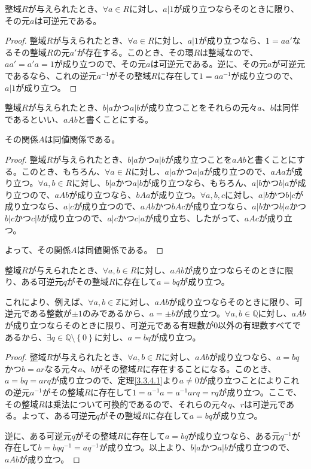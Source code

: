\documentclass[dvipdfmx]{jsarticle}
\begin{document}
\begin{thm}\label{3.3.4.2}
整域$R$が与えられたとき、$\forall a \in R$に対し、$a|1$が成り立つならそのときに限り、その元$a$は可逆元である。
\end{thm}
\begin{proof}
整域$R$が与えられたとき、$\forall a \in R$に対し、$a|1$が成り立つなら、$1 = aa'$なるその整域$R$の元$a'$が存在する。このとき、その環$R$は整域なので、$aa' = a'a = 1$が成り立つので、その元$a$は可逆元である。逆に、その元$a$が可逆元であるなら、これの逆元$a^{-1}$がその整域$R$に存在して$1 = aa^{-1}$が成り立つので、$a|1$が成り立つ。
\end{proof}
\begin{dfn}
整域$R$が与えられたとき、$b|a$かつ$a|b$が成り立つことをそれらの元々$a$、$b$は同伴であるといい、$aAb$と書くことにする。
\end{dfn}
\begin{thm}\label{3.3.4.3} その関係$A$は同値関係である。
\end{thm}
\begin{proof}
整域$R$が与えられたとき、$b|a$かつ$a|b$が成り立つことを$aAb$と書くことにする。このとき、もちろん、$\forall a \in R$に対し、$a|a$かつ$a|a$が成り立つので、$aAa$が成り立つ。$\forall a,b \in R$に対し、$b|a$かつ$a|b$が成り立つなら、もちろん、$a|b$かつ$b|a$が成り立つので、$aAb$が成り立つなら、$bAa$が成り立つ。$\forall a,b,c$に対し、$a|b$かつ$b|c$が成り立つなら、$a|c$が成り立つので、$aAb$かつ$bAc$が成り立つなら、$a|b$かつ$b|a$かつ$b|c$かつ$c|b$が成り立つので、$a|c$かつ$c|a$が成り立ち、したがって、$aAc$が成り立つ。\par
よって、その関係$A$は同値関係である。
\end{proof}
\begin{thm}\label{3.3.4.4}
整域$R$が与えられたとき、$\forall a,b \in R$に対し、$aAb$が成り立つならそのときに限り、ある可逆元$q$がその整域$R$に存在して$a = bq$が成り立つ。
\end{thm}\par
これにより、例えば、$\forall a,b \in \mathbb{Z}$に対し、$aAb$が成り立つならそのときに限り、可逆元である整数が$\pm 1$のみであるから、$a = \pm b$が成り立つ。$\forall a,b \in \mathbb{Q}$に対し、$aAb$が成り立つならそのときに限り、可逆元である有理数が$0$以外の有理数すべてであるから、$\exists q \in \mathbb{Q} \setminus \left\{ 0 \right\}$に対し、$a = bq$が成り立つ。
\begin{proof}
整域$R$が与えられたとき、$\forall a,b \in R$に対し、$aAb$が成り立つなら、$a = bq$かつ$b = ar$なる元々$a$、$b$がその整域$R$に存在することになる。このとき、$a = bq = arq$が成り立つので、定理\ref{3.3.4.1}より$a \neq 0$が成り立つことによりこれの逆元$a^{-1}$がその整域$R$に存在して$1 = a^{-1}a = a^{-1}arq = rq$が成り立つ。ここで、その整域$R$は乗法について可換的であるので、それらの元々$q$、$r$は可逆元である。よって、ある可逆元$q$がその整域$R$に存在して$a = bq$が成り立つ。\par
逆に、ある可逆元$q$がその整域$R$に存在して$a = bq$が成り立つなら、ある元$q^{-1}$が存在して$b = bqq^{-1} = aq^{-1}$が成り立つ。以上より、$b|a$かつ$a|b$が成り立つので、$aAb$が成り立つ。
\end{proof}
\end{document}
